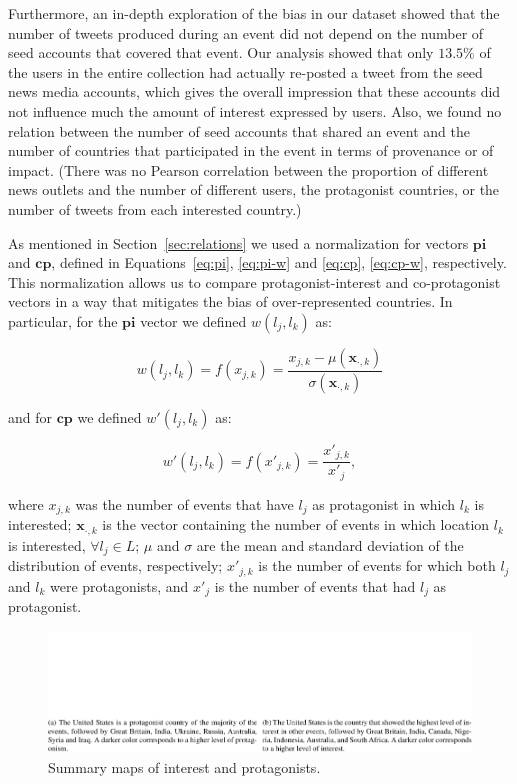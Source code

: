 
Furthermore, an in-depth exploration of the bias in our dataset showed that the
number of tweets produced during an event did not depend on the number of seed
accounts that covered that event. 
%
Our analysis showed that only $13.5\%$ of the users in the entire collection had
actually re-posted a tweet from the seed news media accounts, which gives the
overall impression that these accounts did not influence much the amount of
interest expressed by users. 
%
Also, we found no relation between the number of seed accounts that shared an event
and the number of countries that participated in the event in terms of
provenance or of impact. 
%
(There was no Pearson correlation between the proportion of different news
outlets and the number of different users, the protagonist countries, or the
number of tweets from each interested country.)


As mentioned in Section~\ref{sec:relations} we used a normalization for vectors
$\mathbf{pi}$ and $\mathbf{cp}$, defined in Equations~\ref{eq:pi}, \ref{eq:pi-w}
and \ref{eq:cp}, \ref{eq:cp-w}, respectively. 
%
This normalization allows us to compare protagonist-interest and co-protagonist
vectors in a way that mitigates the bias of over-represented countries. 
%
In particular, for the $\mathbf{pi}$ vector we defined $w(l_j,l_k)$ as:

$$w(l_j, l_k) = f(x_{j,k})= \frac{x_{j,k} - \mu(\mathbf{x}_{\cdot,k})}{\sigma(\mathbf{x}_{\cdot,k})}$$

\noindent and for $\mathbf{cp}$ we defined $w'(l_j,l_k)$ as:

$$w'(l_j, l_k) = f(x'_{j,k})= \frac{x'_{j,k}}{x'_{j}},$$

\noindent where $x_{j,k}$ was the number of events that have $l_j$ as
protagonist in which $l_k$ is interested; $\mathbf{x}_{\cdot,k}$ is the vector
containing the number of events in which location $l_k$ is interested, $\forall
l_j \in L$; $\mu$ and $\sigma$ are the mean and standard deviation of the
distribution of events, respectively; $x'_{j,k}$ is the number of events for
which both $l_j$ and $l_k$ were protagonists, and $x'_{j}$ is the number of
events that had $l_j$ as protagonist.

\begin{figure}[t]
\centering
\includegraphics[width=\textwidth]{figures/geopolitical/choropleths.pdf}
\caption{Summary maps of interest and protagonists.}\label{fig:maps}
\end{figure}

